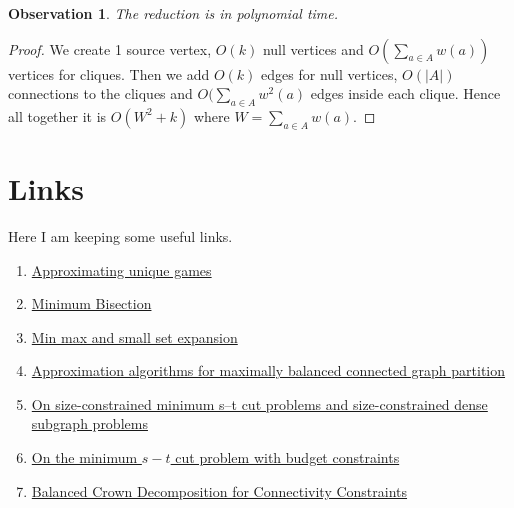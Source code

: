 \documentclass{article}
\theoremstyle{plain}
\newtheorem{observ}[thm]{Observation}
\theoremstyle{plain}
\theoremstyle{remark}
\begin{document}
	\begin{observ}
		The reduction is in polynomial time.
	\end{observ}

	\begin{proof}
		We create 1 source vertex, $O(k)$ null vertices and $O(\sum_{a \in A} w(a))$ vertices for cliques. Then we add $O(k)$ edges for null vertices, $O(|A|)$ connections to the cliques and $O(\sum_{a \in A} w^2(a)$ edges inside each clique. Hence all together it is $O(W^2 + k)$ where $W = \sum_{a \in A} w(a)$.
	\end{proof}
	
	\section{Links}
	
	Here I am keeping some useful links.
	
	\begin{enumerate}
		\item \href{https://www.semanticscholar.org/paper/Approximating-unique-games-Gupta-Talwar/a90ecfd407e1730c9039fdc46e7efefcc46dcfda}{Approximating unique games}
		\item \href{https://www.khoury.northeastern.edu/home/austin/papers/bisection.pdf}{Minimum Bisection}
		\item \href{https://epubs.siam.org/doi/abs/10.1137/120873996}{Min max and small set expansion}
		\item \href{https://link.springer.com/article/10.1007/s00453-021-00870-3}{Approximation algorithms for maximally balanced connected graph partition}
		\item \href{https://www.sciencedirect.com/science/article/pii/S0304397515009378}{On size-constrained minimum s–t cut problems and size-constrained dense subgraph problems}
		\item \href{https://link.springer.com/article/10.1007/s10107-023-01987-9}{On the minimum $s-t$ cut problem with budget constraints}
		\item \href{https://drops.dagstuhl.de/entities/document/10.4230/LIPIcs.ESA.2021.26}{Balanced Crown Decomposition for Connectivity Constraints}
	\end{enumerate}
	
\end{document}
